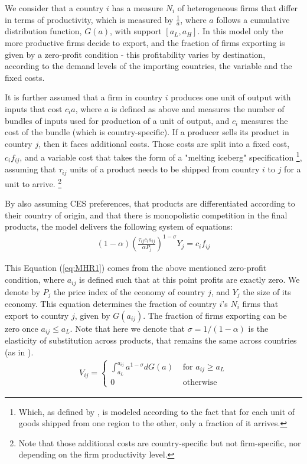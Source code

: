 We consider that a country $i$ has a measure $N_i$ of heterogeneous firms that differ in terms of productivity, which is measured by $\frac{1}{a}$, where $a$ follows a cumulative distribution function, $G(a)$, with support $[a_L, a_H]$. In this model only the more productive firms decide to export, and the fraction of firms exporting is given by a zero-profit condition - this profitability varies by destination, according to the demand levels of the importing countries, the variable and the fixed costs.

It is further assumed that a firm in country $i$ produces one unit of output with inputs that cost $c_i a$, where $a$ is defined as above and measures the number of bundles of inputs used for production of a unit of output, and $c_i$ measures the cost of the bundle (which is country-specific). If a producer sells its product in country $j$, then it faces additional costs. Those costs are split into a fixed cost, $c_i f_{ij}$, and a variable cost that takes the form of a "melting iceberg" specification \footnote{Which, as defined by \cite{krugman1991increasing}, is modeled according to the fact that for each unit of goods shipped from one region to the other, only a fraction of it arrives.}, assuming that $\tau_{ij}$ units of a product needs to be shipped from country $i$ to $j$ for a unit to arrive. \footnote{Note that those additional costs are country-specific but not firm-specific, nor depending on the firm productivity level.} 

By also assuming CES preferences, that products are differentiated according to their country of origin, and that there is monopolistic competition in the final products, the model delivers the following system of equations:
\begin{align}
    (1-\alpha)\left(\frac{\tau_{i j} c_{i} a_{i j}}{\alpha P_{j}}\right)^{1-\sigma} Y_{j}=c_{i} f_{i j}
    \label{eq:MHR1}
\end{align}

This Equation (\ref{eq:MHR1}) comes from the above mentioned zero-profit condition, where $a_{ij}$ is defined such that at this point profits are exactly zero. We denote by $P_j$ the price index of the economy of country $j$, and $Y_j$ the size of its economy. This equation determines the fraction of country $i$'s $N_i$ firms that export to country $j$, given by $G(a_{ij})$. The fraction of firms exporting can be zero once $a_{ij} \leq a_L$. Note that here we denote that $\sigma = 1/(1-\alpha)$ is the elasticity of substitution across products, that remains the same across countries (as in \cite{anderson1979theoretical}).
\begin{align}
    V_{i j}=\left\{\begin{array}{cc}
\int_{a_{L}}^{a_{i j}} a^{1-\sigma} d G(a) & \text { for } a_{i j} \geq a_{L} \\
0 & \text { otherwise }
\end{array}\right.
\label{eq:MHR2}
\end{align}


